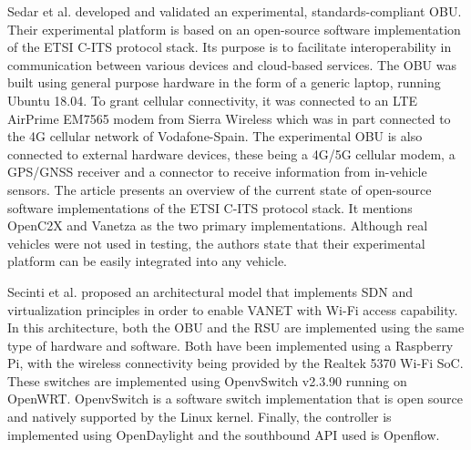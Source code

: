     \cite{Sedar et al., 2021} 
    Sedar et al. developed and validated an experimental, standards-compliant OBU. Their experimental platform is based on an open-source software implementation of the ETSI C-ITS protocol stack. Its purpose is to facilitate interoperability in communication between various devices and cloud-based services.
    The OBU was built using general purpose hardware in the form of a generic laptop, running Ubuntu 18.04. To grant cellular connectivity, it was connected to an LTE AirPrime EM7565 modem from Sierra Wireless which was in part connected to the 4G cellular network of Vodafone-Spain. The experimental OBU is also connected to external hardware devices, these being a 4G/5G cellular modem, a GPS/GNSS receiver and a connector to receive information from in-vehicle sensors.
    The article presents an overview of the current state of open-source software implementations of the ETSI C-ITS protocol stack. It mentions OpenC2X and Vanetza as the two primary implementations. 
    Although real vehicles were not used in testing, the authors state that their experimental platform can be easily integrated into any vehicle.
    
    \cite{Secinti et al., 2017}
    Secinti et al. proposed an architectural model that implements SDN and virtualization principles in order to enable VANET with Wi-Fi access capability. 
    In this architecture, both the OBU and the RSU are implemented using the same type of hardware and software. Both have been implemented using a Raspberry Pi, with the wireless connectivity being provided by the Realtek 5370 Wi-Fi SoC.
    These switches are implemented using OpenvSwitch v2.3.90 running on OpenWRT. OpenvSwitch is a software switch implementation that is open source and natively supported by the Linux kernel\cite{https://www.openvswitch.org/}. Finally, the controller is implemented using OpenDaylight and the southbound API used is Openflow.
    
